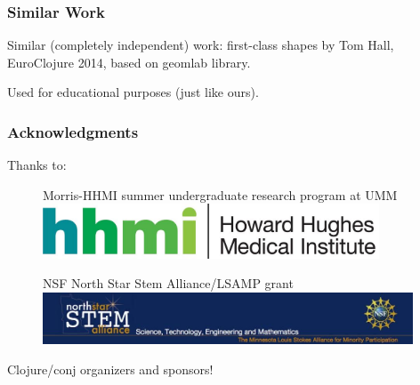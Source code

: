 \documentclass{beamer}
\begin{document}
\begin{frame}
	\frametitle{Similar Work}
Similar (completely independent) work: first-class shapes by Tom Hall, EuroClojure 2014, based on geomlab library. 

Used for educational purposes (just like ours).
\end{frame} 

\begin{frame}
\frametitle{Acknowledgments}
	{\large Thanks to:}
	\begin{figure}
		Morris-HHMI summer undergraduate research program at UMM \includegraphics[width=10cm]{PresentationImages/logoHHMI.jpg}
	\end{figure}
	\begin{figure}
		NSF North Star Stem Alliance/LSAMP grant 
		\includegraphics[width=11cm]{PresentationImages/logoStem.jpg}
	\end{figure}	
	{\centering \qquad Clojure/conj organizers and sponsors!}
\end{frame}
\end{document}
